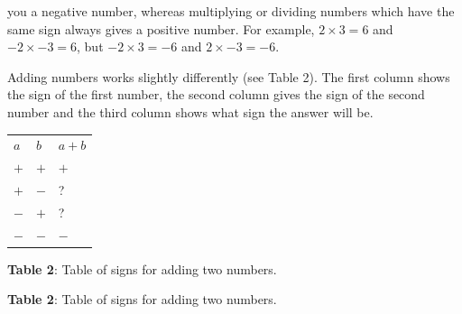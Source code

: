 you a negative number, whereas multiplying or dividing numbers which have the
same sign always gives a positive number. For example, $2\ensuremath{\times}3=6$ and
$-2\ensuremath{\times}-3=6$, but $-2\ensuremath{\times}3=-6$ and $2\ensuremath{\times}-3=-6$.\par 
        \label{m38346*id174517}Adding numbers works slightly differently (see Table 2). The first column shows the sign of the first number, the
second column gives the sign of the second number and the third column shows
what sign the answer will be.\par 
          \begin{table}
        \begin{center}
      \label{m38346*uid25}
    \noindent
      \tablelasttail{}
      \begin{xtabular}[t]{|l|l|l|}\hline
                  $a$
                 &
                  $b$
                 &
                  $a+b$
     \tabularnewline{}
                  $+$
                 &
                  $+$
                 &
                  $+$
     \tabularnewline{}
                  $+$
                 &
                  $-$
                 &
        ?%
     \tabularnewline{}
                  $-$
                 &
                  $+$
                 &
        ?%
     \tabularnewline{}
                  $-$
                 &
                  $-$
                 &
                  $-$
     \tabularnewline{}
    \end{xtabular}
      \end{center}
    \begin{center}{\small\bfseries Table 2}: Table of signs for adding two numbers.\end{center}
    \begin{caption}{\small\bfseries Table 2}: Table of signs for adding two numbers.\end{caption}
\end{table}
